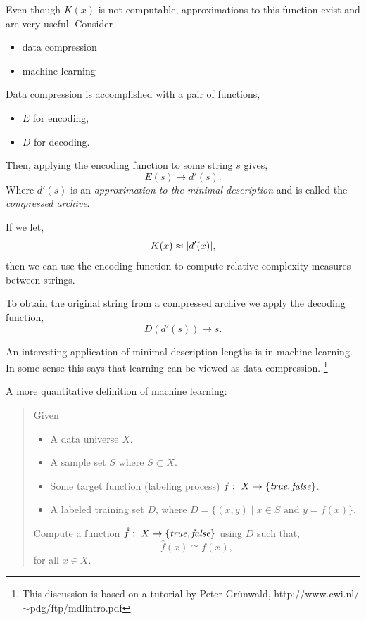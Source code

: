 \documentclass[a4paper,blends,pdf,colorBG,slideColor]{prosper}
\begin{document}


Even though $K(x)$ is not computable, approximations to this function exist
and are very useful.  Consider
\begin{itemize}
\item data compression
\item machine learning
\end{itemize}
\es


Data compression is accomplished with a pair of functions, 
\begin{itemize}
\item $E$ for encoding, 
\item $D$ for decoding. 
\end{itemize}
Then, applying the encoding function to some string $s$ gives,
\[
E(s) \mapsto d'(s).
\]
Where $d'(s)$ is an {\em approximation to the minimal description} and is called the {\em compressed archive}.

If we let,
\[
K(x) \approx {|{d'(x)}|},
\]
then we can use the encoding function to compute relative complexity measures between strings.

To obtain the original string from a compressed archive we apply the decoding function,
\[
D(d'(s)) \mapsto s.
\]


 
\es


\small
An interesting application of minimal description lengths is in machine learning.  In some sense
this says that learning can be viewed as data compression.
\footnote{This discussion is based on a tutorial by Peter Gr\"unwald, http://www.cwi.nl/$\sim$pdg/ftp/mdlintro.pdf}



\es


A more quantitative definition of machine learning:
\begin{quote}

Given
\begin{itemize}
\item A data universe $X$.
\item A sample set $S$ where $S \subset X$.
\item Some target function (labeling process) $f\,\colon\; X \rightarrow \{\text{\it true}, \text{\it false}\}$.
\item A labeled training set $D$, where
$
D = \{ (x ,y) \mid x \in S \text{ and } y = f(x)\}.
$
\end{itemize}
Compute a function $\hat{f}\,\colon\; X \rightarrow \{ \text{\it true}, \text{\it false}\}$ using $D$ such that,
\begin{equation*}
\label{eq:process-model}
\hat{f}(x) \cong f(x),
\end{equation*}
for all $x \in X$.
\end{quote}
\end{document}
